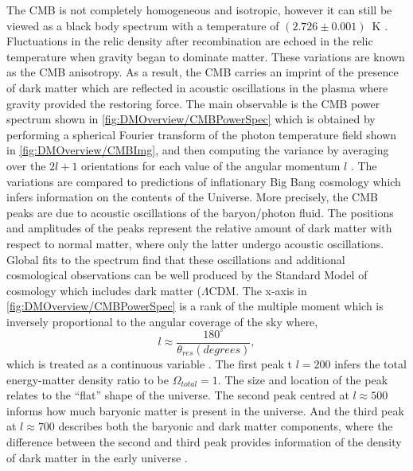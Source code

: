 The CMB is not completely homogeneous and isotropic, however it can still be viewed as a black body spectrum with a temperature of $(2.726\pm0.001)$~K \cite{Fixsen_2009}. Fluctuations in the relic density after recombination are echoed in the relic temperature when gravity began to dominate matter. These variations are known as the CMB anisotropy. As a result, the CMB carries an imprint of the presence of dark matter which are reflected in acoustic oscillations in the plasma where gravity provided the restoring force. The main observable is the CMB power spectrum shown in \autoref{fig:DMOverview/CMBPowerSpec} which is obtained by performing a spherical Fourier transform of the photon temperature field shown in \autoref{fig:DMOverview/CMBImg}, and then computing the variance by averaging over the $2l+1$ orientations for each value of the angular momentum $l$ \cite{Cirelli:2024ssz}. The variations are compared to predictions of inflationary Big Bang cosmology which infers information on the contents of the Universe. More precisely, the CMB peaks are due to acoustic oscillations of the baryon/photon fluid. The positions and amplitudes of the peaks represent the relative amount of dark matter with respect to normal matter, where only the latter undergo acoustic oscillations. Global fits to the spectrum find that these oscillations and additional cosmological observations can be well produced by the Standard Model of cosmology which includes dark matter ($\Lambda \text{CDM}$. The x-axis in \autoref{fig:DMOverview/CMBPowerSpec} is a rank of the multiple moment which is inversely proportional to the angular coverage of the sky where,
\begin{equation}
    l \approx\frac{180^{\circ}}{\theta_{res}(degrees)},
\end{equation}
which is treated as a continuous variable \cite{Young2016}. The first peak t $l=200$ infers the total energy-matter density ratio to be $\Omega_{total}=1$. The size and location of the peak relates to the ``flat'' shape of the universe. The second peak centred at $l\approx500$ informs how much baryonic matter is present in the universe. And the third peak at $l\approx700$ describes both the baryonic and dark matter components, where the difference between the second and third peak provides information of the density of dark matter in the early universe \cite{Young2016}.
